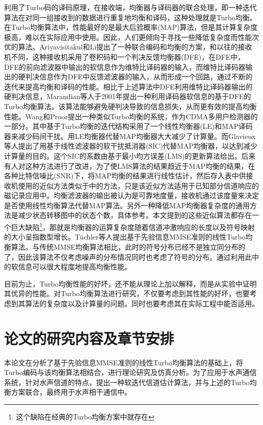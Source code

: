 利用了Turbo码的译码原理，在接收端，均衡器与译码器的联合处理，即一种迭代算法在对同一组接收到的数据进行重复地均衡和译码，这种处理就是Turbo均衡\citep{douillard1995,Anastasopoulos1997}。
在Turbo均衡算法中，性能最好的是最大后验概率(MAP)算法\citep{Davis2001}，但是其计算复杂度极高，难以在实际应用中使用。因此，人们更倾向于寻找一些降低复杂度而性能次优的算法。Ariyavisitakul和Li\citep{ariyavisitakul1998}提出了一种联合编码和均衡的方案，和以往的接收机不同，这种接收机采用了卷积码和一个判决反馈均衡器(DFE)，在DFE中，DFE的前向滤波器中输出的软信息作为维特比译码器的输入，而维特比译码器输出的硬判决信息作为DFE中反馈滤波器的输入，从而形成一个回路，通过不断的迭代来提高均衡和译码的性能。相比于上述算法中DFE利用维特比译码器\citep{Joachim1989}输出的硬判决信息，Marandian等人\citep{Marandian}于2001年提出一种利用译码器软信息的基于DFE的Turbo均衡算法。该算法能够避免硬判决导致的信息损失，从而更有效的提高均衡性能。Wang和Proor\citep{wang1999iterative}提出一种类似Turbo均衡的系统，作为CDMA多用户检测器的一部分。其中基于Turbo均衡的迭代结构采用了一个线性均衡器(LE)和MAP译码器来减少码间干扰。用LE均衡器代替MAP均衡器大大减少了计算量。而Glavieux\citep{glavieux1997turbo}等人提出了用基于线性滤波器的软干扰抵消器(SIC)代替MAP均衡器，以达到减少计算量的目的。这个SIC的系数由基于最小均方误差(LMS)的更新算法给出。后来有人对这种方法进行了改进，为了使LMS算法的结果趋近于MAP均衡的结果，在各种比特信噪比(SNR)下，将MAP均衡的结果进行线性估计，然后存入表中供接收机使用\citep{raphaeli2000,wu2000turbo}的近似方法类似于中的方法，只是该近似方法适用于已知部分信道响应的磁记录应用中。均衡滤波器的输出被认为是可靠地度量，接收机通过该度量来决定是否使用线性均衡算法代替MAP算法。另外一种降低MAP均衡器复杂度的通用方法是减少状态转移图中的状态个数，具体参考。本文提到的这些近似算法都存在一个巨大缺陷\footnote{这个缺陷在经典的Turbo均衡方案中就存在}，那就是均衡器的运算复杂度随着信道冲激响应的长度以及符号映射的大小呈指数型增长。T{\"u}chler\citep{Tuchler2002a,Tuchler,Tuchler2011}等人提出基于先验信息MMSE准则的线性Turbo均衡算法。与传统MMSE均衡算法相比，此时的符号分布已经不是独立同分布的了，因此该算法不仅考虑噪声的分布情况同时也考虑了符号的分布。通过利用此中的软信息可以很大程度地提高均衡性能。

目前为止，Turbo均衡性能的好坏，还不能从理论上加以解释，而是从实验中证明其优异的性能。对Turbo均衡算法进行研究，不仅要考虑到其性能的好坏，也要考虑到其算法的复杂度以及计算量的问题。同时也要考虑其在实际工程中能否适用。
\section{论文的研究内容及章节安排}
本论文在分析了基于先验信息MMSE准则的线性Turbo均衡算法的基础上，将Turbo编码与该均衡算法相结合，进行理论研究及仿真分析。为了应用于水声通信系统，针对水声信道的特点，提出一种软迭代信道估计算法，并与上述的Turbo均衡方案联合，最终用于水声相干通信中。

